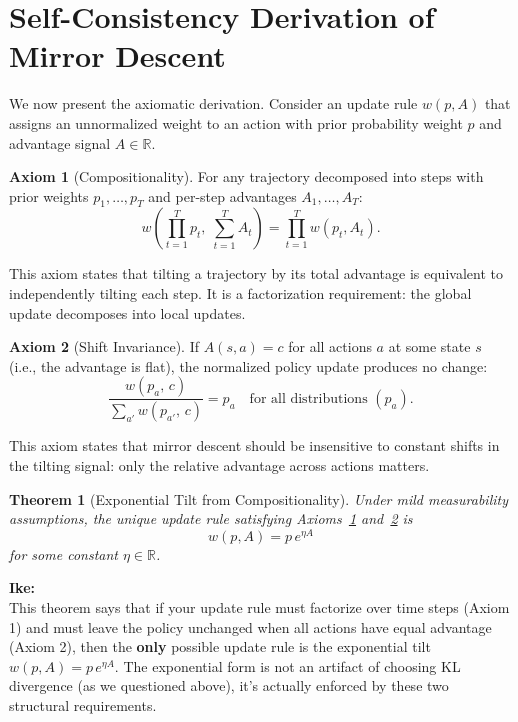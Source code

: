 \documentclass[11pt]{article}
\newtheorem{theorem}{Theorem}
\theoremstyle{definition}
\newtheorem{axiom}{Axiom}
\theoremstyle{remark}
\newenvironment{ike}{\color{blue}\textbf{Ike:}\\}{}
\newcommand{\R}{\mathbb{R}}
\begin{document}
\section{Self-Consistency Derivation of Mirror Descent}
\label{sec:self-consistency}

We now present the axiomatic derivation. Consider an update rule $w(p, A)$ that assigns an unnormalized weight to an action with prior probability weight $p$ and advantage signal $A \in \R$.

\begin{axiom}[Compositionality]\label{ax:comp}
For any trajectory decomposed into steps with prior weights $p_1, \ldots, p_T$ and per-step advantages $A_1, \ldots, A_T$:
\[
  w\!\left(\prod_{t=1}^T p_t,\; \sum_{t=1}^T A_t\right) = \prod_{t=1}^T w(p_t, A_t).
\]
\end{axiom}

This axiom states that tilting a trajectory by its total advantage is equivalent to independently tilting each step. It is a factorization requirement: the global update decomposes into local updates.

\begin{axiom}[Shift Invariance]\label{ax:neut}
If $A(s,a) = c$ for all actions $a$ at some state $s$ (i.e., the advantage is flat), the normalized policy update produces no change:
\[
  \frac{w(p_a,\, c)}{\sum_{a'} w(p_{a'},\, c)} = p_a \quad \text{for all distributions } (p_a).
\]
\end{axiom}

This axiom states that mirror descent should be insensitive to constant shifts in the tilting signal: only the relative advantage across actions matters.

\begin{theorem}[Exponential Tilt from Compositionality]\label{thm:main}
Under mild measurability assumptions, the unique update rule satisfying Axioms~\ref{ax:comp} and~\ref{ax:neut} is
\[
  w(p, A) = p\,e^{\eta A}
\]
for some constant $\eta \in \R$.
\end{theorem}

\begin{ike}
This theorem says that if your update rule must factorize over time steps (Axiom 1) and must leave the policy unchanged when all actions have equal advantage (Axiom 2), then the \textbf{only} possible update rule is the exponential tilt $w(p, A) = p\,e^{\eta A}$. The exponential form is not an artifact of choosing KL divergence (as we questioned above), it's actually enforced by these two structural requirements.
\end{ike}
\end{document}
